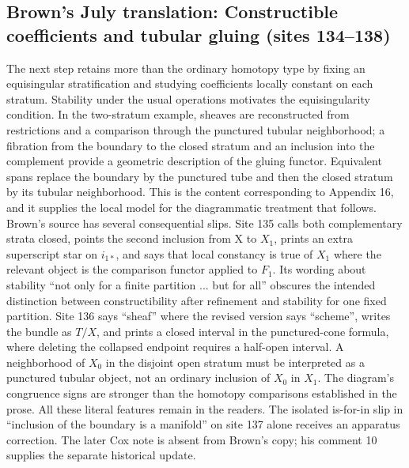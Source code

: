 \subsection*{Brown's July translation: Constructible coefficients and tubular gluing (sites 134--138)}
The next step retains more than the ordinary homotopy type by fixing an equisingular stratification and studying coefficients locally constant on each stratum. Stability under the usual operations motivates the equisingularity condition. In the two-stratum example, sheaves are reconstructed from restrictions and a comparison through the punctured tubular neighborhood; a fibration from the boundary to the closed stratum and an inclusion into the complement provide a geometric description of the gluing functor. Equivalent spans replace the boundary by the punctured tube and then the closed stratum by its tubular neighborhood. This is the content corresponding to Appendix 16, and it supplies the local model for the diagrammatic treatment that follows. Brown's source has several consequential slips. Site 135 calls both complementary strata closed, points the second inclusion from X to $X_1$, prints an extra superscript star on $i_{1*}$, and says that local constancy is true of $X_1$ where the relevant object is the comparison functor applied to $F_1$. Its wording about stability ``not only for a finite partition ... but for all'' obscures the intended distinction between constructibility after refinement and stability for one fixed partition. Site 136 says ``sheaf'' where the revised version says ``scheme'', writes the bundle as $T/X$, and prints a closed interval in the punctured-cone formula, where deleting the collapsed endpoint requires a half-open interval. A neighborhood of $X_0$ in the disjoint open stratum must be interpreted as a punctured tubular object, not an ordinary inclusion of $X_0$ in $X_1$. The diagram's congruence signs are stronger than the homotopy comparisons established in the prose. All these literal features remain in the readers. The isolated is-for-in slip in ``inclusion of the boundary is a manifold'' on site 137 alone receives an apparatus correction. The later Cox note is absent from Brown's copy; his comment 10 supplies the separate historical update.

